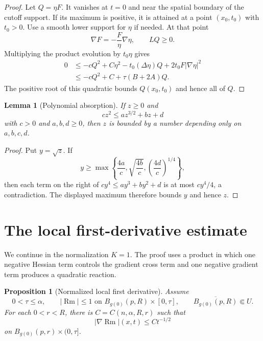 \documentclass[10pt]{coll-l}
\newtheorem{lemma}[theorem]{Lemma}
\newtheorem{proposition}[theorem]{Proposition}
\theoremstyle{definition}
\theoremstyle{remark}
\numberwithin{section}{chapter}
\numberwithin{equation}{chapter}
\newcommand{\Rm}{\operatorname{Rm}}
\begin{document}
\begin{proof}
Let $Q=\eta F$.  It vanishes at $t=0$ and near the spatial boundary of the
cutoff support.  If its maximum is positive, it is attained at a point
$(x_0,t_0)$ with $t_0>0$.  Use a smooth lower support for $\eta$ if needed.
At that point
\[
 \nabla F=-\frac F\eta\nabla\eta,
 \qquad LQ\geq0.
\]
Multiplying the product evolution by $t_0\eta$ gives
\begin{align*}
 0&\leq-cQ^2+C\eta^2-t_0(\Delta\eta)Q
                  +2t_0F|\nabla\eta|^2\\
  &\leq-cQ^2+C+\tau(B+2A)Q.
\end{align*}
The positive root of this quadratic bounds $Q(x_0,t_0)$ and hence all of
$Q$.
\end{proof}

\begin{lemma}[Polynomial absorption]
\label{lem:shi-polynomial-absorption}
If $z\geq0$ and
\[
       cz^2\leq az^{3/2}+bz+d
\]
with $c>0$ and $a,b,d\geq0$, then $z$ is bounded by a number depending only
on $a,b,c,d$.
\end{lemma}

\begin{proof}
Put $y=\sqrt z$.  If
\[
 y\geq\max\left\{\frac{4a}{c},
                   \sqrt{\frac{4b}{c}},
                   \left(\frac{4d}{c}\right)^{1/4}\right\},
\]
then each term on the right of $cy^4\leq ay^3+by^2+d$ is at most
$cy^4/4$, a contradiction.  The displayed maximum therefore bounds $y$
and hence $z$.
\end{proof}

\section{The local first-derivative estimate}
\label{sec:shi-first}

We continue in the normalization $K=1$.  The proof uses a product in which
one negative Hessian term controls the gradient cross term and one negative
gradient term produces a quadratic reaction.

\begin{proposition}[Normalized local first derivative]
\label{prop:shi-normalized-first}
Assume
\[
 0<\tau\leq\alpha,
 \qquad |\Rm|\leq1
   \text{ on }B_{g(0)}(p,R)\times[0,\tau],
 \qquad \overline{B_{g(0)}(p,R)}\Subset U.
\]
For each $0<r<R$, there is
$C=C(n,\alpha,R,r)$ such that
\begin{equation}
       |\nabla\Rm|(x,t)\leq Ct^{-1/2}                    \label{eq:shi-normalized-first}
\end{equation}
on $B_{g(0)}(p,r)\times(0,\tau]$.
\end{proposition}
\end{document}
